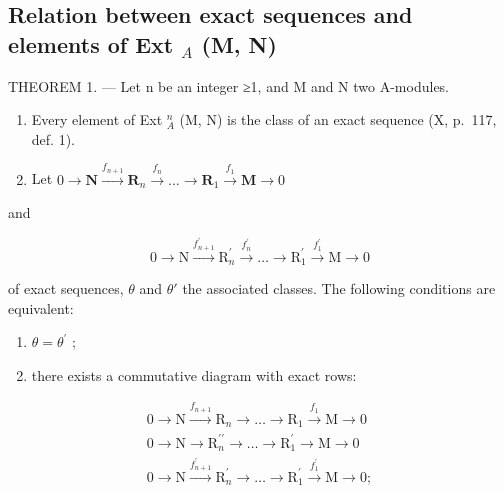 \subsection{\texorpdfstring{Relation between exact sequences and elements of Ext \(_{A}\) (M, N)}{Relation between exact sequences and elements of Ext \_\{A\} (M, N)}}

THEOREM 1. --- Let n be an integer ≥1, and M and N two A-modules.

\begin{enumerate}
\def\labelenumi{\alph{enumi})}
\item
  Every element of Ext \(_{A}^{n}\) (M, N) is the class of an exact sequence (X, p.~117, def. 1).
\item
  Let \(0 \to \mathbf{N} \xrightarrow{f_{n+1}} \mathbf{R}_n \xrightarrow{f_n} \ldots \to \mathbf{R}_1 \xrightarrow{f_1} \mathbf{M} \to 0\)
\end{enumerate}

and

\[
0 \rightarrow \mathrm{N} \xrightarrow {f _ {n + 1} ^ {\prime}} \mathrm{R} _ {n} ^ {\prime} \xrightarrow {f _ {n} ^ {\prime}} \dots \rightarrow \mathrm{R} _ {1} ^ {\prime} \xrightarrow {f _ {1} ^ {\prime}} \mathrm{M} \rightarrow 0
\]

of exact sequences, \(\theta\) and \(\theta'\) the associated classes. The following conditions are equivalent:

\begin{enumerate}
\def\labelenumi{(\roman{enumi})}
\item
  \(\theta = \theta^{\prime}\) ;
\item
  there exists a commutative diagram with exact rows:
\end{enumerate}

\[
\begin{array}{c} 0 \longrightarrow \mathrm{N} \xrightarrow {f _ {n + 1}} \mathrm{R} _ {n} \longrightarrow \dots \longrightarrow \mathrm{R} _ {1} \xrightarrow {f _ {1}} \mathrm{M} \longrightarrow 0 \\ 0 \longrightarrow \mathrm{N} \longrightarrow \mathrm{R} _ {n} ^ {\prime \prime} \longrightarrow \dots \longrightarrow \mathrm{R} _ {1} ^ {\prime} \longrightarrow \mathrm{M} \longrightarrow 0 \\ 0 \longrightarrow \mathrm{N} \xrightarrow {f _ {n + 1} ^ {\prime}} \mathrm{R} _ {n} ^ {\prime} \longrightarrow \dots \longrightarrow \mathrm{R} _ {1} ^ {\prime} \xrightarrow {f _ {1} ^ {\prime}} \mathrm{M} \longrightarrow 0; \end{array}
\]

